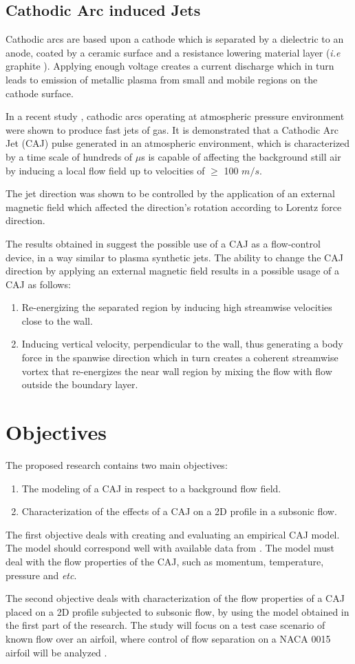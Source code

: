 \documentclass[10pt,a4paper]{article}
\begin{document}
\subsection{Cathodic Arc induced Jets}
Cathodic arcs are based upon a cathode which is separated by a dielectric to an anode, coated by a ceramic surface and a resistance lowering material layer (\textit{i.e} graphite \cite{KR}). Applying enough voltage creates a current discharge which in turn leads to emission of metallic plasma from small and mobile regions on the cathode surface. 
\par In a recent study \cite{KR}, cathodic arcs operating at atmospheric pressure environment were shown to produce fast jets of gas. It is demonstrated that a Cathodic Arc Jet (CAJ) pulse generated in an atmospheric environment, which is characterized by a time scale of hundreds of $\mu$s is capable of affecting the background still air by inducing a local flow field up to velocities of $\ge$ 100 $m/s$. 
\par The jet direction was shown to be controlled by the application of an external magnetic field which affected the direction's rotation according to Lorentz force direction. 
\par The results obtained in \cite{KR} suggest the possible use of a CAJ as a flow-control device, in a way similar to plasma synthetic jets. The ability to change the CAJ direction by applying an external magnetic field results in a possible usage of a CAJ as follows:
\begin{enumerate}
	\item Re-energizing the separated region by inducing high streamwise velocities close to the wall.
	\item Inducing vertical velocity, perpendicular to the wall, thus generating a body force in the spanwise direction which in turn creates a coherent streamwise vortex that re-energizes the near wall region by mixing the flow with flow outside the boundary layer. 
\end{enumerate} 
\section{Objectives}
The proposed research contains two main objectives:
\begin{enumerate}
    \item The modeling of a CAJ in respect to a background flow field.
    \item Characterization of the effects of a CAJ on a 2D profile in a subsonic flow.
\end{enumerate}
The first objective deals with creating and evaluating an empirical CAJ model. The model should correspond well with available data from \cite{KR}. The model must deal with the flow properties of the CAJ, such as momentum, temperature, pressure and \textit{etc}.
\par The second objective deals with characterization of the flow properties of a CAJ placed on a 2D profile subjected to subsonic flow, by using the model obtained in the first part of the research. The study will focus on a test case scenario of known flow over an airfoil, where control of flow separation on a \textsc{NACA 0015} airfoil will be analyzed  \cite{FLOWCTRL,KOK}.   
\end{document}
